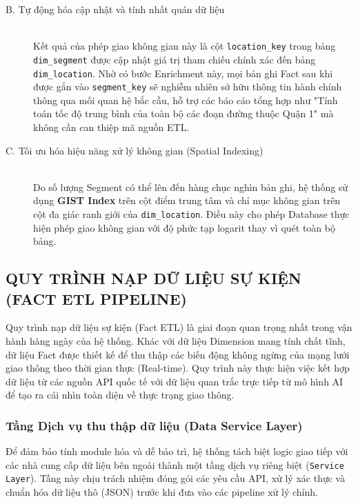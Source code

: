 \begin{description}
    \item[B. Tự động hóa cập nhật và tính nhất quán dữ liệu] \hfill \\
    Kết quả của phép giao không gian này là cột \texttt{location\_key} trong bảng \texttt{dim\_segment} được cập nhật giá trị tham chiếu chính xác đến bảng \texttt{dim\_location}. Nhờ có bước Enrichment này, mọi bản ghi Fact sau khi được gắn vào \texttt{segment\_key} sẽ nghiễm nhiên sở hữu thông tin hành chính thông qua mối quan hệ bắc cầu, hỗ trợ các báo cáo tổng hợp như "Tính toán tốc độ trung bình của toàn bộ các đoạn đường thuộc Quận 1" mà không cần can thiệp mã nguồn ETL.

    \item[C. Tối ưu hóa hiệu năng xử lý không gian (Spatial Indexing)] \hfill \\
    Do số lượng Segment có thể lên đến hàng chục nghìn bản ghi, hệ thống sử dụng \textbf{GIST Index} trên cột điểm trung tâm và chỉ mục không gian trên cột đa giác ranh giới của \texttt{dim\_location}. Điều này cho phép Database thực hiện phép giao không gian với độ phức tạp logarit thay vì quét toàn bộ bảng.
\end{description}

\subsection{QUY TRÌNH NẠP DỮ LIỆU SỰ KIỆN (FACT ETL PIPELINE)}

Quy trình nạp dữ liệu sự kiện (Fact ETL) là giai đoạn quan trọng nhất trong vận hành hàng ngày của hệ thống. Khác với dữ liệu Dimension mang tính chất tĩnh, dữ liệu Fact được thiết kế để thu thập các biến động không ngừng của mạng lưới giao thông theo thời gian thực (Real-time). Quy trình này thực hiện việc kết hợp dữ liệu từ các nguồn API quốc tế với dữ liệu quan trắc trực tiếp từ mô hình AI để tạo ra cái nhìn toàn diện về thực trạng giao thông.

\subsubsection{Tầng Dịch vụ thu thập dữ liệu (Data Service Layer)}

Để đảm bảo tính module hóa và dễ bảo trì, hệ thống tách biệt logic giao tiếp với các nhà cung cấp dữ liệu bên ngoài thành một tầng dịch vụ riêng biệt (\texttt{Service Layer}). Tầng này chịu trách nhiệm đóng gói các yêu cầu API, xử lý xác thực và chuẩn hóa dữ liệu thô (JSON) trước khi đưa vào các pipeline xử lý chính.

